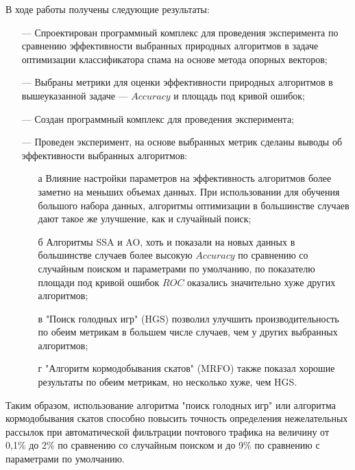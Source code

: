В ходе работы получены следующие результаты:
\begin{itemize}
    \item[—] Спроектирован программный комплекс для проведения эксперимента по сравнению эффективности 
        выбранных природных алгоритмов в задаче оптимизации классификатора спама на основе метода опорных векторов;
    \item[—] Выбраны метрики для оценки эффективности природных алгоритмов в 
        вышеуказанной задаче — $Accuracy$ и площадь под кривой ошибок; 
    \item[—] Создан программный комплекс для проведения эксперимента;
    \item[—] Проведен эксперимент, на основе выбранных метрик сделаны выводы об 
    эффективности выбранных алгоритмов:
        \begin{itemize}
            \item[а] Влияние настройки параметров на эффективность алгоритмов более заметно на меньших объемах данных. 
            При использовании для обучения большого набора данных, 
            алгоритмы оптимизации в большинстве случаев дают такое же улучшение, как и случайный поиск;
            
            \item[б] Алгоритмы SSA и AO, хоть и показали на новых данных в большинстве случаев 
            более высокую $Accuracy$ по сравнению со случайным поиском и параметрами по умолчанию, по показателю площади 
            под кривой ошибок $ROC$ оказались значительно хуже других алгоритмов;
            
            \item[в] "Поиск голодных игр" (HGS) позволил улучшить производительность по обеим метрикам в большем числе 
            случаев, чем у других выбранных алгоритмов;

            \item[г] "Алгоритм кормодобывания скатов" (MRFO) также показал хорошие результаты по обеим метрикам, но 
            несколько хуже, чем HGS.
        \end{itemize}
\end{itemize}

Таким образом, использование алгоритма "поиск голодных игр" или алгоритма кормодобывания скатов 
способно повысить точность определения нежелательных рассылок при автоматической фильтрации 
почтового трафика на величину от 0,1\% до 2\% по сравнению со случайным поиском и до 9\% по сравнению с 
параметрами по умолчанию.

